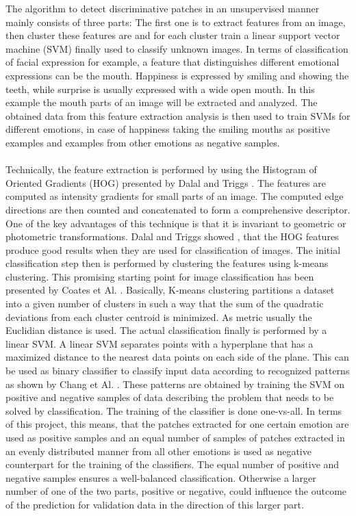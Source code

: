 The algorithm to detect discriminative patches in an unsupervised manner mainly consists of three parts: The first one is to extract features from an image, then cluster these features are  and for each cluster train a linear support vector machine (SVM) finally used to classify unknown images. In terms of classification of facial expression for example, a feature that distinguishes different emotional expressions can be the mouth. Happiness is expressed by smiling and showing the teeth, while surprise is usually expressed with a wide open mouth. In this example the mouth parts of an image will be extracted and analyzed. The obtained data from this feature extraction analysis is then used to train SVMs for different emotions, in case of happiness taking the smiling mouths as positive examples and examples from other emotions as negative samples.
\\
\\
Technically, the feature extraction is performed by using the Histogram of Oriented Gradients (HOG) presented by Dalal and Triggs \cite{Dalal:2005:HOG:1068507.1069007}. The features are computed as intensity gradients for small parts of an image. The computed edge directions are then counted and concatenated to form a comprehensive descriptor. One of the key advantages of this technique is that it is invariant to geometric or photometric transformations. Dalal and Triggs showed \cite{Dalal:2005:HOG:1068507.1069007}, that the HOG features produce good results when they are used for classification of images. The initial classification step then is performed by clustering the features using k-means clustering. This promising starting point for image classification has been presented by Coates et Al. \cite{DBLP:series/lncs/CoatesN12}. Basically, K-means clustering partitions a dataset into a given number of clusters in such a way that the sum of the quadratic deviations from each cluster centroid is minimized. As metric usually the Euclidian distance is used. The actual classification finally is performed by a linear SVM. A linear SVM separates points with a hyperplane that has a maximized distance to the nearest data points on each side of the plane. This can be used as binary classifier to classify input data according to recognized patterns as shown by Chang et Al. \cite{Chang:2011:LLS:1961189.1961199}. These patterns are obtained by training the SVM on positive and negative samples of data describing the problem that needs to be solved by classification. The training of the classifier is done one-vs-all. In terms of this project, this means, that the patches extracted for one certain emotion are used as positive samples and an equal number of samples of patches extracted in an evenly distributed manner from all other emotions is used as negative counterpart for the training of the classifiers. The equal number of positive and negative samples ensures a well-balanced classification. Otherwise a larger number of one of the two parts, positive or negative, could influence the outcome of the prediction for validation data in the direction of this larger part.

